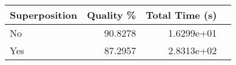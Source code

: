 \begin{tabular}{lrrr}
    \hline
    Superposition & Quality \% & Total Time (s) \\
    \hline
    No            & 90.8278    & 1.6299e+01     \\
    Yes           & 87.2957    & 2.8313e+02     \\
    \hline
\end{tabular}
